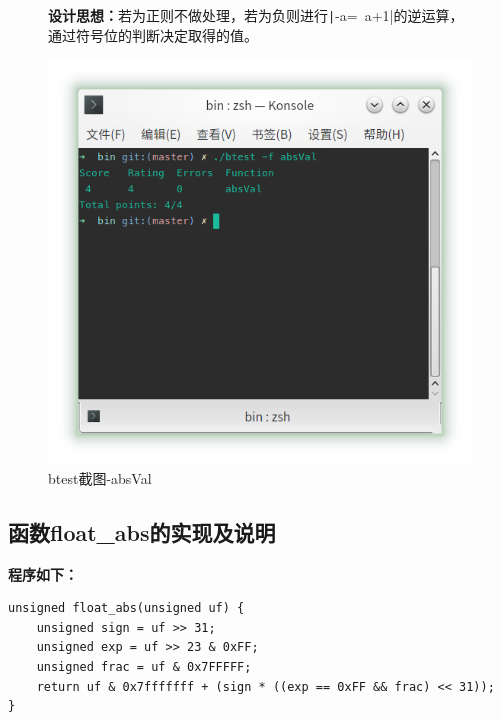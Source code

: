 \begin{figure}[H]
\begin{minipage}[c]{0.5\linewidth}
\textbf{设计思想：}若为正则不做处理，若为负则进行\texttt|-a=~a+1|的逆运算，通过符号位的判断决定取得的值。
\end{minipage}
\begin{minipage}[c]{0.4\linewidth}
\centering
\includegraphics[width=0.9\linewidth]{figures/absVal}
\caption{btest截图-absVal}
\label{fig:absVal}
\end{minipage}
\end{figure}

\subsection{函数float\_abs的实现及说明}
\textbf{程序如下：}

\begin{verbatim}
unsigned float_abs(unsigned uf) {
    unsigned sign = uf >> 31;
    unsigned exp = uf >> 23 & 0xFF;
    unsigned frac = uf & 0x7FFFFF;
    return uf & 0x7fffffff + (sign * ((exp == 0xFF && frac) << 31));
}
\end{verbatim}

